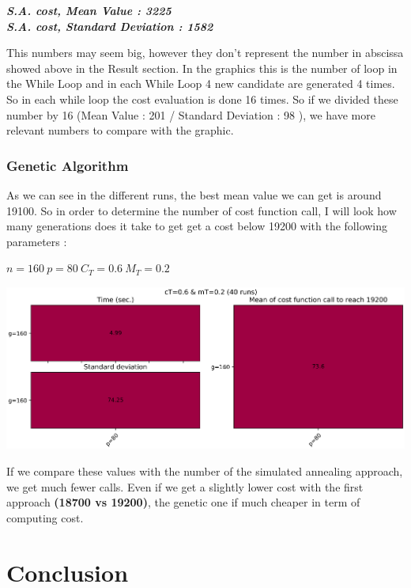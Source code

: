 \documentclass[11pt]{article}
\begin{document}
\textbf{\emph{S.A. cost, Mean Value : 3225\\
S.A. cost, Standard Deviation : 1582}}

This numbers may seem big, however they don't represent the number in
abscissa showed above in the Result section. In the graphics this is the
number of loop in the While Loop and in each While Loop 4 new candidate
are generated 4 times. So in each while loop the cost evaluation is
done 16 times. So if we divided these number by 16 (Mean Value : 201 /
Standard Deviation : 98 ), we have more relevant numbers to compare with
the graphic.

\hypertarget{genetic-algorithm}{%
\subsubsection{Genetic Algorithm}\label{genetic-algorithm}}

As we can see in the different runs, the best mean value we can get is
around 19100. So in order to determine the number of cost function call,
I will look how many generations does it take to get get a cost below
19200 with the following parameters :

\(n = 160\ p = 80\ C_{T}=0.6\ M_{T}=0.2\)

\begin{center}
\includegraphics{images/image_genetic_table_5}
\end{center}

If we compare these values with the number of the simulated annealing
approach, we get much fewer calls. Even if we get a slightly lower cost
with the first approach \textbf{(18700 vs 19200)}, the genetic one if
much cheaper in term of computing cost.

    \hypertarget{conclusion}{%
\section{Conclusion}\label{conclusion}}
\end{document}
